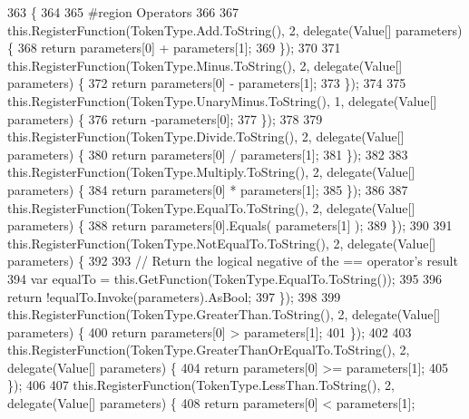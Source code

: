 \begin{DoxyCode}
363                                      \{
364 
365 \textcolor{preprocessor}{                #region Operators}
366 \textcolor{preprocessor}{}
367                 this.RegisterFunction(TokenType.Add.ToString(), 2, delegate(Value[] parameters) \{
368                     \textcolor{keywordflow}{return} parameters[0] + parameters[1];
369                 \});
370 
371                 this.RegisterFunction(TokenType.Minus.ToString(), 2, delegate(Value[] parameters) \{
372                     \textcolor{keywordflow}{return} parameters[0] - parameters[1];
373                 \});
374 
375                 this.RegisterFunction(TokenType.UnaryMinus.ToString(), 1, delegate(Value[] parameters) \{
376                     \textcolor{keywordflow}{return} -parameters[0];
377                 \});
378 
379                 this.RegisterFunction(TokenType.Divide.ToString(), 2, delegate(Value[] parameters) \{
380                     \textcolor{keywordflow}{return} parameters[0] / parameters[1];
381                 \});
382 
383                 this.RegisterFunction(TokenType.Multiply.ToString(), 2, delegate(Value[] parameters) \{
384                     \textcolor{keywordflow}{return} parameters[0] * parameters[1];
385                 \});
386 
387                 this.RegisterFunction(TokenType.EqualTo.ToString(), 2, delegate(Value[] parameters) \{
388                     \textcolor{keywordflow}{return} parameters[0].Equals( parameters[1] );
389                 \});
390 
391                 this.RegisterFunction(TokenType.NotEqualTo.ToString(), 2, delegate(Value[] parameters) \{
392 
393                     \textcolor{comment}{// Return the logical negative of the == operator's result}
394                     var equalTo = this.GetFunction(TokenType.EqualTo.ToString());
395 
396                     \textcolor{keywordflow}{return} !equalTo.Invoke(parameters).AsBool;
397                 \});
398 
399                 this.RegisterFunction(TokenType.GreaterThan.ToString(), 2, delegate(Value[] parameters) \{
400                     \textcolor{keywordflow}{return} parameters[0] > parameters[1];
401                 \});
402 
403                 this.RegisterFunction(TokenType.GreaterThanOrEqualTo.ToString(), 2, delegate(Value[] 
      parameters) \{
404                     \textcolor{keywordflow}{return} parameters[0] >= parameters[1];
405                 \});
406 
407                 this.RegisterFunction(TokenType.LessThan.ToString(), 2, delegate(Value[] parameters) \{
408                     \textcolor{keywordflow}{return} parameters[0] < parameters[1];

\end{DoxyCode}
